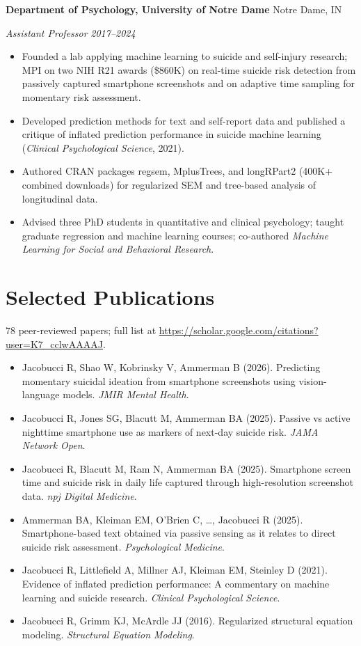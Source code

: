 \documentclass[10pt,letterpaper]{article}
\newcommand{\org}[2]{\textbf{#1} \hfill #2\par}
\newcommand{\role}[2]{\textit{#1} \hfill \textit{#2}\par\vspace{1pt}}
\newcommand{\pub}[1]{\item #1}
\begin{document}
\vspace{3pt}
\org{Department of Psychology, University of Notre Dame}{Notre Dame, IN}
\role{Assistant Professor}{2017--2024}
\begin{itemize}
\item Founded a lab applying machine learning to suicide and self-injury research; MPI on two NIH R21 awards (\$860K) on real-time suicide risk detection from passively captured smartphone screenshots and on adaptive time sampling for momentary risk assessment.
\item Developed prediction methods for text and self-report data and published a critique of inflated prediction performance in suicide machine learning (\textit{Clinical Psychological Science}, 2021).
\item Authored CRAN packages regsem, MplusTrees, and longRPart2 (400K+ combined downloads) for regularized SEM and tree-based analysis of longitudinal data.
\item Advised three PhD students in quantitative and clinical psychology; taught graduate regression and machine learning courses; co-authored \textit{Machine Learning for Social and Behavioral Research}.
\end{itemize}

\section{Selected Publications}
78 peer-reviewed papers; full list at \url{https://scholar.google.com/citations?user=K7_cclwAAAAJ}.
\begin{itemize}
\pub{Jacobucci R, Shao W, Kobrinsky V, Ammerman B (2026). Predicting momentary suicidal ideation from smartphone screenshots using vision-language models. \textit{JMIR Mental Health}.}
\pub{Jacobucci R, Jones SG, Blacutt M, Ammerman BA (2025). Passive vs active nighttime smartphone use as markers of next-day suicide risk. \textit{JAMA Network Open}.}
\pub{Jacobucci R, Blacutt M, Ram N, Ammerman BA (2025). Smartphone screen time and suicide risk in daily life captured through high-resolution screenshot data. \textit{npj Digital Medicine}.}
\pub{Ammerman BA, Kleiman EM, O'Brien C, \ldots, Jacobucci R (2025). Smartphone-based text obtained via passive sensing as it relates to direct suicide risk assessment. \textit{Psychological Medicine}.}
\pub{Jacobucci R, Littlefield A, Millner AJ, Kleiman EM, Steinley D (2021). Evidence of inflated prediction performance: A commentary on machine learning and suicide research. \textit{Clinical Psychological Science}.}
\pub{Jacobucci R, Grimm KJ, McArdle JJ (2016). Regularized structural equation modeling. \textit{Structural Equation Modeling}.}
\end{itemize}
\end{document}
